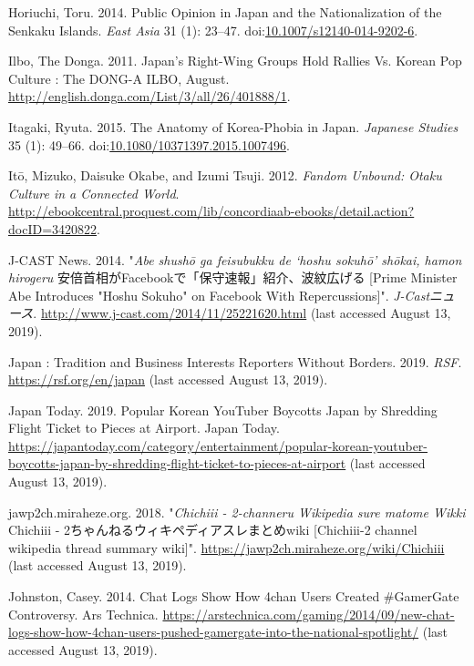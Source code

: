 \documentclass[10pt,british,A4paper,oneside]{memoir}
\begin{document}
\hypertarget{ref-horiuchi_public_2014}{}
Horiuchi, Toru. 2014. Public Opinion in Japan and the Nationalization of
the Senkaku Islands. \emph{East Asia} 31 (1): 23--47.
doi:\href{https://doi.org/10.1007/s12140-014-9202-6}{10.1007/s12140-014-9202-6}.

\hypertarget{ref-the_donga_ilbo_japans_2011}{}
Ilbo, The Donga. 2011. Japan's Right-Wing Groups Hold Rallies Vs. Korean
Pop Culture : The DONG-A ILBO, August.
\url{http://english.donga.com/List/3/all/26/401888/1}.

\hypertarget{ref-itagaki_anatomy_2015}{}
Itagaki, Ryuta. 2015. The Anatomy of Korea-Phobia in Japan.
\emph{Japanese Studies} 35 (1): 49--66.
doi:\href{https://doi.org/10.1080/10371397.2015.1007496}{10.1080/10371397.2015.1007496}.

\hypertarget{ref-ito_fandom_2012}{}
Itō, Mizuko, Daisuke Okabe, and Izumi Tsuji. 2012. \emph{Fandom Unbound:
Otaku Culture in a Connected World}.
\url{http://ebookcentral.proquest.com/lib/concordiaab-ebooks/detail.action?docID=3420822}.

\hypertarget{ref-j-cast_news_eng:_2014}{}
J-CAST News. 2014. "\emph{Abe shushō ga feisubukku de `hoshu sokuhō' shōkai, hamon hirogeru} 安倍首相がFacebookで「保守速報」紹介、波紋広げる [Prime Minister Abe Introduces "Hoshu Sokuho" on Facebook With Repercussions]". \emph{J-Castニュース}.
\url{http://www.j-cast.com/2014/11/25221620.html} (last accessed August 13, 2019).

\hypertarget{ref-noauthor_japan_2019}{}
Japan : Tradition and Business Interests Reporters Without Borders.
2019. \emph{RSF}. \url{https://rsf.org/en/japan} (last accessed August 13, 2019).

\hypertarget{ref-japan_today_popular_2019}{}
Japan Today. 2019. Popular Korean YouTuber Boycotts Japan by Shredding
Flight Ticket to Pieces at Airport. Japan Today.
\url{https://japantoday.com/category/entertainment/popular-korean-youtuber-boycotts-japan-by-shredding-flight-ticket-to-pieces-at-airport} (last accessed August 13, 2019).

\hypertarget{ref-anonymous_chichiii_2018}{}
jawp2ch.miraheze.org. 2018. "\emph{Chichiii - 2-channeru Wikipedia sure matome Wikki} Chichiii - 2ちゃんねるウィキペディアスレまとめwiki [Chichiii-2 channel wikipedia thread summary wiki]".
\url{https://jawp2ch.miraheze.org/wiki/Chichiii} (last accessed August 13, 2019).

\hypertarget{ref-johnston_chat_2014}{}
Johnston, Casey. 2014. Chat Logs Show How 4chan Users Created
\#GamerGate Controversy. Ars Technica.
\url{https://arstechnica.com/gaming/2014/09/new-chat-logs-show-how-4chan-users-pushed-gamergate-into-the-national-spotlight/} (last accessed August 13, 2019).
\end{document}
